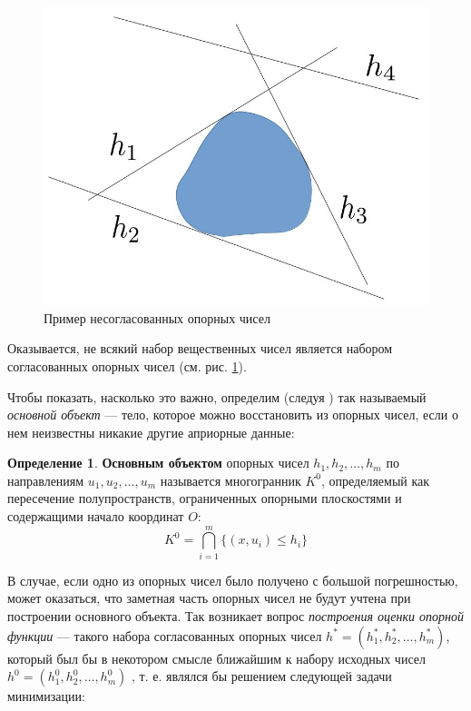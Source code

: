 \documentclass[a4paper, 10pt]{article}
\theoremstyle{definition}
\newtheorem{SmartDefinition}{Определение}
\theoremstyle{plain}
\theoremstyle{plain}
\begin{document}
\begin{figure}
 \begin{center}
  \includegraphics[scale=0.25]{images/Incosistency-example}
 \end{center}
 \caption{Пример несогласованных опорных чисел}
 \label{image:inconsistent}
\end{figure}

Оказывается, не всякий набор вещественных чисел является набором согласованных
опорных чисел (см. рис. \ref{image:inconsistent}).

Чтобы показать, насколько это важно, определим (следуя
\cite{PrinceWillsky}) так называемый \textit{основной объект} ---
тело, которое можно восстановить из опорных чисел, если о нем неизвестны никакие
другие априорные данные:

\begin{SmartDefinition}
 \label{def:basic-object}
 \textbf{Основным объектом} опорных чисел $h_{1}, h_{2}, \ldots, h_{m}$ по
 направлениям $u_{1}, u_{2}, \ldots, u_{m}$ называется многогранник $K^{0}$,
 определяемый как пересечение полупространств, ограниченных опорными плоскостями
 и содержащими начало координат $O$:
 \begin{equation}
  K^{0} = \bigcap \limits_{i = 1}^{m}\{(x, u_{i}) \leq h_{i}\}
 \end{equation}
\end{SmartDefinition}

В случае, если одно из опорных чисел было получено с большой погрешностью, может
оказаться, что заметная часть опорных чисел не будут учтена при построении
основного объекта. Так возникает вопрос \textit{построения оценки опорной
функции} --- такого набора согласованных опорных чисел
$h^{*} = (h^{*}_{1}, h^{*}_{2}, \ldots, h^{*}_{m})$, который был бы в некотором
смысле ближайшим к набору исходных чисел
$h^{0} = (h^{0}_{1}, h^{0}_{2}, \ldots, h^{0}_{m})$
, т. е. являлся бы решением следующей задачи
минимизации:
\end{document}
